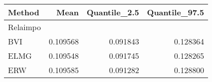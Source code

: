 \begin{table}[ht]
\centering
\begin{tabular}{lrrr}
  \hline
Method & Mean & Quantile\_2.5 & Quantile\_97.5 \\ 
  \hline
Relaimpo &  &  &  \\ 
  BVI & 0.109568 & 0.091843 & 0.128364 \\ 
  ELMG & 0.109548 & 0.091745 & 0.128265 \\ 
  ERW & 0.109585 & 0.091282 & 0.128800 \\ 
   \hline
\end{tabular}
\end{table}
